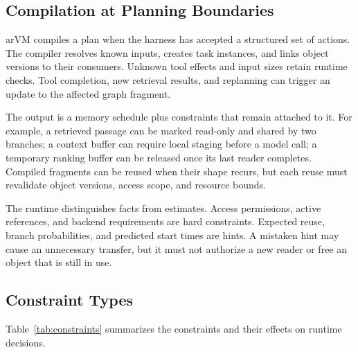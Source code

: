 \documentclass[letterpaper,twocolumn,10pt]{article}
\newcommand{\arvm}{arVM\xspace}
\begin{document}
\subsection{Compilation at Planning Boundaries}

\arvm compiles a plan when the harness has accepted a structured set of actions.
The compiler resolves known inputs, creates task instances, and links object
versions to their consumers. Unknown tool effects and input sizes retain
runtime checks. Tool completion, new retrieval results, and replanning can
trigger an update to the affected graph fragment.

The output is a memory schedule plus constraints that remain attached to it.
For example, a retrieved passage can be marked read-only and shared by two
branches; a context buffer can require local staging before a model call;
a temporary ranking buffer can be released once its last reader completes.
Compiled fragments can be reused when their shape recurs, but each reuse must
revalidate object versions, access scope, and resource bounds.

The runtime distinguishes facts from estimates. Access permissions, active
references, and backend requirements are hard constraints. Expected reuse,
branch probabilities, and predicted start times are hints. A mistaken hint
may cause an unnecessary transfer, but it must not authorize a new reader or
free an object that is still in use.

\subsection{Constraint Types}

Table~\ref{tab:constraints} summarizes the constraints and their effects on
runtime decisions.
\end{document}

